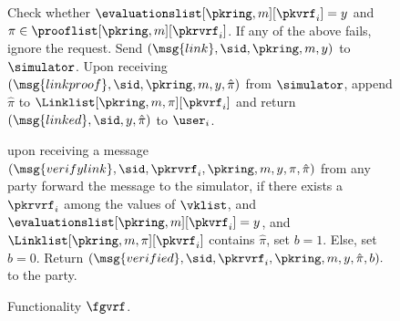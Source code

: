 \begin{figure}
\begin{tcolorbox}
{\begin{description}
				Check whether $\evaluationslist[\pkring, m][\pkvrf_i] = y$ and $ \pi \in \prooflist[\pkring, m][\pkrvrf_i] $. If any of the above fails, ignore the request.
				Send $(\msg{link}, \sid, \pkring, m, y)$ to $\simulator$. Upon receiving $(\msg{linkproof}, \sid, \pkring, m, y, \hat \pi)$ from $\simulator$, append $\hat\pi$ to $\Linklist[\pkring, m, \pi][\pkvrf_i]$ and return $(\msg{linked}, \sid, y, \hat\pi)$ to $\user_i$.
				\item[Linking verification.] upon receiving a message $(\msg{verifylink}, \sid, \pkrvrf_i, \pkring, m, y,\pi,\hat\pi)$ from any party forward the message to the simulator, if there exists a $\pkrvrf_i$ among the values of $ \vklist $, and $\evaluationslist[\pkring, m][\pkvrf_i] = y$, and $\Linklist[\pkring, m, \pi][\pkvrf_i]$ contains $\hat\pi$, set $b=1$. Else, set $b=0$. Return $(\msg{verified}, \sid, \pkrvrf_i, \pkring, m, y, \hat\pi, b).$ to the party.
			\end{description}
		}
	\end{tcolorbox}
	\caption{Functionality $\fgvrf$.\label{f:gvrf}}
\end{figure}
